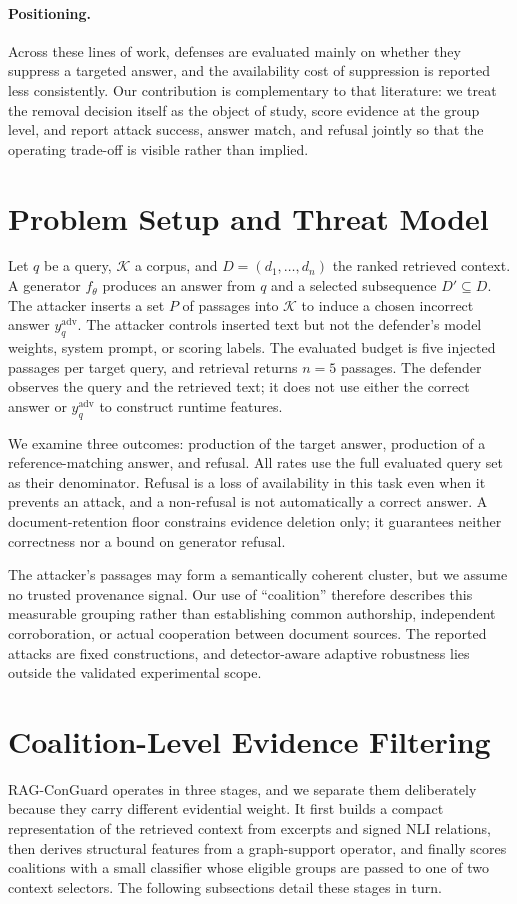 \documentclass[sigconf]{aamas}
\begin{document}
\paragraph{Positioning.}
Across these lines of work, defenses are evaluated mainly on whether they suppress a targeted answer, and the availability cost of suppression is reported less consistently. Our contribution is complementary to that literature: we treat the removal decision itself as the object of study, score evidence at the group level, and report attack success, answer match, and refusal jointly so that the operating trade-off is visible rather than implied.

\section{Problem Setup and Threat Model}
Let $q$ be a query, $\mathcal{K}$ a corpus, and $D=(d_1,\ldots,d_n)$ the ranked retrieved context. A generator $f_\theta$ produces an answer from $q$ and a selected subsequence $D'\subseteq D$. The attacker inserts a set $P$ of passages into $\mathcal{K}$ to induce a chosen incorrect answer $y^{\mathrm{adv}}_q$. The attacker controls inserted text but not the defender's model weights, system prompt, or scoring labels. The evaluated budget is five injected passages per target query, and retrieval returns $n=5$ passages. The defender observes the query and the retrieved text; it does not use either the correct answer or $y^{\mathrm{adv}}_q$ to construct runtime features.

We examine three outcomes: production of the target answer, production of a reference-matching answer, and refusal. All rates use the full evaluated query set as their denominator. Refusal is a loss of availability in this task even when it prevents an attack, and a non-refusal is not automatically a correct answer. A document-retention floor constrains evidence deletion only; it guarantees neither correctness nor a bound on generator refusal.

The attacker's passages may form a semantically coherent cluster, but we assume no trusted provenance signal. Our use of ``coalition'' therefore describes this measurable grouping rather than establishing common authorship, independent corroboration, or actual cooperation between document sources. The reported attacks are fixed constructions, and detector-aware adaptive robustness lies outside the validated experimental scope.

\section{Coalition-Level Evidence Filtering}
\label{sec:method}
RAG-ConGuard operates in three stages, and we separate them deliberately because they carry different evidential weight. It first builds a compact representation of the retrieved context from excerpts and signed NLI relations, then derives structural features from a graph-support operator, and finally scores coalitions with a small classifier whose eligible groups are passed to one of two context selectors. The following subsections detail these stages in turn.
\end{document}
